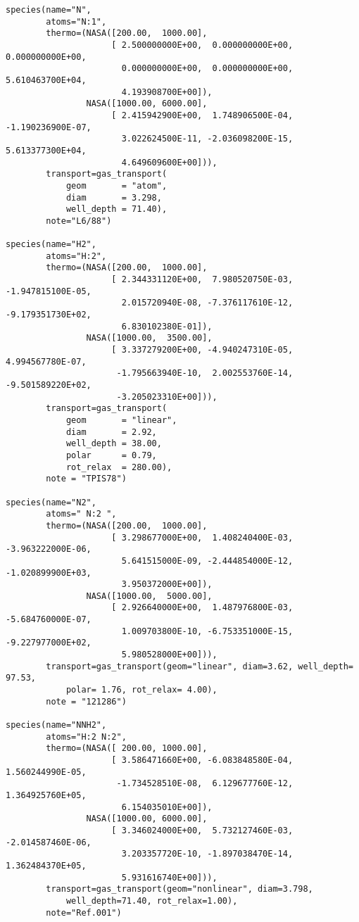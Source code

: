 \begin{verbatim}
species(name="N",
        atoms="N:1",
        thermo=(NASA([200.00,  1000.00],
                     [ 2.500000000E+00,  0.000000000E+00,  0.000000000E+00,
                       0.000000000E+00,  0.000000000E+00,  5.610463700E+04,
                       4.193908700E+00]),
                NASA([1000.00, 6000.00],
                     [ 2.415942900E+00,  1.748906500E-04, -1.190236900E-07,
                       3.022624500E-11, -2.036098200E-15,  5.613377300E+04,
                       4.649609600E+00])),
        transport=gas_transport(
            geom       = "atom",
            diam       = 3.298,
            well_depth = 71.40),
        note="L6/88")

species(name="H2",
        atoms="H:2",
        thermo=(NASA([200.00,  1000.00],
                     [ 2.344331120E+00,  7.980520750E-03, -1.947815100E-05,
                       2.015720940E-08, -7.376117610E-12, -9.179351730E+02,
                       6.830102380E-01]),
                NASA([1000.00,  3500.00],
                     [ 3.337279200E+00, -4.940247310E-05,  4.994567780E-07,
                      -1.795663940E-10,  2.002553760E-14, -9.501589220E+02,
                      -3.205023310E+00])),
        transport=gas_transport(
            geom       = "linear",
            diam       = 2.92,
            well_depth = 38.00,
            polar      = 0.79,
            rot_relax  = 280.00),
        note = "TPIS78")

species(name="N2",
        atoms=" N:2 ",
        thermo=(NASA([200.00,  1000.00],
                     [ 3.298677000E+00,  1.408240400E-03, -3.963222000E-06,
                       5.641515000E-09, -2.444854000E-12, -1.020899900E+03,
                       3.950372000E+00]),
                NASA([1000.00,  5000.00],
                     [ 2.926640000E+00,  1.487976800E-03, -5.684760000E-07,
                       1.009703800E-10, -6.753351000E-15, -9.227977000E+02,
                       5.980528000E+00])),
        transport=gas_transport(geom="linear", diam=3.62, well_depth= 97.53,
            polar= 1.76, rot_relax= 4.00),
        note = "121286")

species(name="NNH2",
        atoms="H:2 N:2",
        thermo=(NASA([ 200.00, 1000.00],
                     [ 3.586471660E+00, -6.083848580E-04,  1.560244990E-05,
                      -1.734528510E-08,  6.129677760E-12,  1.364925760E+05,
                       6.154035010E+00]),
                NASA([1000.00, 6000.00],
                     [ 3.346024000E+00,  5.732127460E-03, -2.014587460E-06,
                       3.203357720E-10, -1.897038470E-14,  1.362484370E+05,
                       5.931616740E+00])),
        transport=gas_transport(geom="nonlinear", diam=3.798, 
            well_depth=71.40, rot_relax=1.00),
        note="Ref.001")


\end{verbatim}
